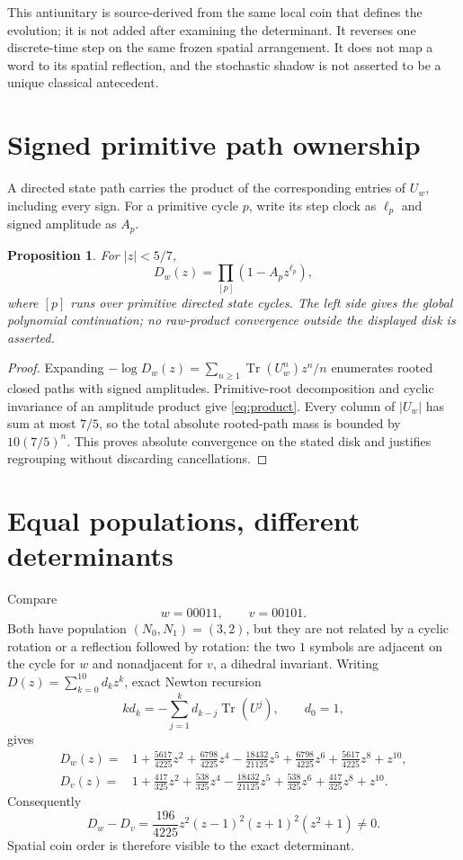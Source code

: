 \documentclass[11pt]{article}
\newtheorem{proposition}{Proposition}
\newcommand{\Tr}{\operatorname{Tr}}
\begin{document}
This antiunitary is source-derived from the same local coin that defines the
evolution; it is not added after examining the determinant.  It reverses one
discrete-time step on the same frozen spatial arrangement.  It does not map a
word to its spatial reflection, and the stochastic shadow is not asserted to
be a unique classical antecedent.

\section{Signed primitive path ownership}
A directed state path carries the product of the corresponding entries of
$U_w$, including every sign.  For a primitive cycle $p$, write its step
clock as $\ell_p$ and signed amplitude as $A_p$.

\begin{proposition}\label{prop:product}
For $|z|<5/7$,
\begin{equation}\label{eq:product}
 D_w(z)=\prod_{[p]}(1-A_pz^{\ell_p}),
\end{equation}
where $[p]$ runs over primitive directed state cycles.  The left side gives
the global polynomial continuation; no raw-product convergence outside the
displayed disk is asserted.
\end{proposition}
\begin{proof}
Expanding
$-\log D_w(z)=\sum_{n\ge1}\Tr(U_w^n)z^n/n$ enumerates rooted closed paths
with signed amplitudes.  Primitive-root decomposition and cyclic invariance
of an amplitude product give \eqref{eq:product}.  Every column of $|U_w|$
has sum at most $7/5$, so the total absolute rooted-path mass is bounded by
$10(7/5)^n$.  This proves absolute convergence on the stated disk and
justifies regrouping without discarding cancellations.
\end{proof}

\section{Equal populations, different determinants}
Compare
\[
 w=00011,\qquad v=00101.
\]
Both have population $(N_0,N_1)=(3,2)$, but they are not related by a cyclic
rotation or a reflection followed by rotation: the two $1$ symbols are
adjacent on the cycle for $w$ and nonadjacent for $v$, a dihedral invariant.
Writing $D(z)=\sum_{k=0}^{10}d_kz^k$, exact Newton recursion
\[
 kd_k=-\sum_{j=1}^{k}d_{k-j}\Tr(U^j),\qquad d_0=1,
\]
gives
\begin{align*}
D_w(z)={}&1+\frac{5617}{4225}z^2+\frac{6798}{4225}z^4
-\frac{18432}{21125}z^5+\frac{6798}{4225}z^6
+\frac{5617}{4225}z^8+z^{10},\\
D_v(z)={}&1+\frac{417}{325}z^2+\frac{538}{325}z^4
-\frac{18432}{21125}z^5+\frac{538}{325}z^6
+\frac{417}{325}z^8+z^{10}.
\end{align*}
Consequently
\begin{equation}\label{eq:difference}
 D_w-D_v=\frac{196}{4225}z^2(z-1)^2(z+1)^2(z^2+1)\ne0.
\end{equation}
Spatial coin order is therefore visible to the exact determinant.
\end{document}
